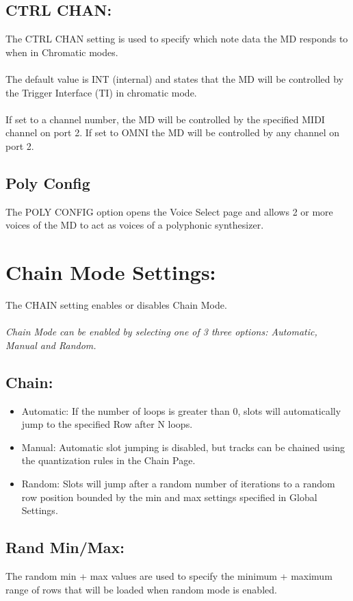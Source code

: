 \subsection{CTRL CHAN:}
The CTRL CHAN setting is used to specify which note data the MD responds to when in Chromatic modes. \\\\The default value is INT (internal) and states that the MD will be controlled by the Trigger Interface (TI) in chromatic mode. \\
\\If set to a channel number, the MD will be controlled by the specified MIDI channel on port 2. If set to OMNI the MD will be controlled by any channel on port 2.
\subsection{Poly Config}
The POLY CONFIG option opens the Voice Select page and allows 2 or more voices of the MD to act as voices of a polyphonic synthesizer.
\section{Chain Mode Settings:}
The CHAIN setting enables or disables Chain Mode.\\
\\
\textit{ Chain Mode can be enabled by selecting one of 3 three options: Automatic, Manual and Random.}
\subsection{Chain:}
\begin{itemize}
	\item Automatic: If the number of loops is greater than 0, slots will automatically jump to the specified Row after N loops.
	\item Manual: Automatic slot jumping is disabled, but tracks can be chained using the quantization rules in the Chain Page.
	\item Random: Slots will jump after a random number of iterations to a random row position bounded by the min and max settings specified in Global Settings.
\end{itemize}
\subsection{Rand Min/Max:}
The random min + max values are used to specify the minimum + maximum range of rows that will be loaded when random mode is enabled.
